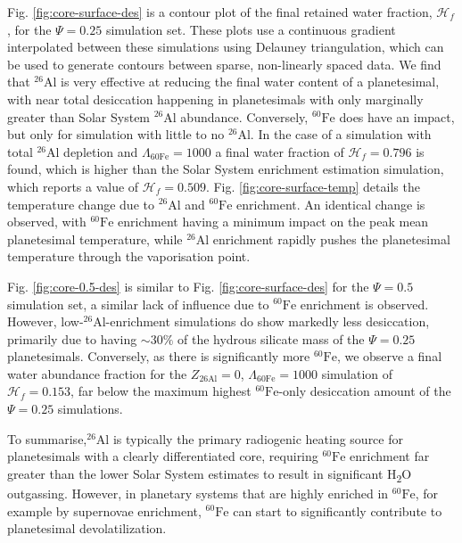 \documentclass[fleqn,usenatbib]{mnras}
\newcommand{\rms}[1]{\ensuremath{_{\text{#1}}}}
\newcommand{\tsu}[1]{\textsubscript{#1}}
\newcommand{\atom}[2]{$^{#2}\text{#1}$}
\newcommand{\al}{\atom{Al}{26}}
\newcommand{\fe}{\atom{Fe}{60}}
\newcommand{\water}{{H\tsu{2}O}}
\newcommand{\waterfracHf}{\mathcal{H}_f}
\begin{document}
Fig. \ref{fig:core-surface-des} is a contour plot of the final retained water fraction, $\waterfracHf$, for the $\Psi = 0.25$ simulation set.
These plots use a continuous gradient interpolated between these simulations using Delauney triangulation, which can be used to generate contours between sparse, non-linearly spaced data.
We find that \al{} is very effective at reducing the final water content of a planetesimal, with near total desiccation happening in planetesimals with only marginally greater than Solar System \al{} abundance.
Conversely, \fe{} does have an impact, but only for simulation with little to no \al{}.
In the case of a simulation with total \al{} depletion and $\Lambda\rms{60Fe} = 1000$ a final water fraction of $\waterfracHf = 0.796$ is found, which is higher than the Solar System enrichment estimation simulation, which reports a value of $\waterfracHf = 0.509$.
Fig. \ref{fig:core-surface-temp} details the temperature change due to \al{} and \fe{} enrichment.
An identical change is observed, with \fe{} enrichment having a minimum impact on the peak mean planetesimal temperature, while \al{} enrichment rapidly pushes the planetesimal temperature through the vaporisation point.

Fig. \ref{fig:core-0.5-des} is similar to Fig. \ref{fig:core-surface-des} for the $\Psi=0.5$ simulation set, a similar lack of influence due to \fe{} enrichment is observed.
However, low-\al{}-enrichment simulations do show markedly less desiccation, primarily due to having $\sim 30\%$ of the hydrous silicate mass of the $\Psi = 0.25$ planetesimals.
Conversely, as there is significantly more \fe{}, we observe a final water abundance fraction for the $Z_{\text{26Al}} = 0$, $\Lambda\rms{60Fe} = 1000$ simulation of $\waterfracHf = 0.153$, far below the maximum highest \fe{}-only desiccation amount of the $\Psi = 0.25$ simulations.

To summarise,\al{} is typically the primary radiogenic heating source for planetesimals with a clearly differentiated core, requiring \fe{} enrichment far greater than the lower Solar System estimates to result in significant \water{} outgassing. However, in planetary systems that are highly enriched in \fe{}, for example by supernovae enrichment, \fe{} can start to significantly contribute to planetesimal devolatilization.
\end{document}

